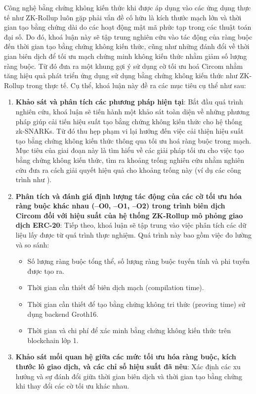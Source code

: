 Công nghệ bằng chứng không kiến thức khi được áp dụng vào các ứng dụng thực tế như ZK-Rollup luôn gặp phải vấn đề cố hữu là kích thước mạch lớn và thời gian tạo bằng chứng dài do các hoạt động mật mã phức tạp trong các thuật toán đại số. Do đó, khoá luận này sẽ tập trung nghiên cứu vào tác động của ràng buộc đến thời gian tạo bằng chứng không kiến thức, cũng như những đánh đổi về thời gian biên dịch để tối ưu mạch chứng minh không kiến thức nhằm giảm số lượng ràng buộc. Từ đó đưa ra một khung gợi ý sử dụng cờ tối ưu hoá Circom nhằm tăng hiệu quả phát triển ứng dụng sử dụng bằng chứng không kiến thức như ZK-Rollup trong thực tế. 
Cụ thể, khoá luận này đề ra các mục tiêu cụ thể như sau:
\begin{enumerate}
    \item \textbf{Khảo sát và phân tích các phương pháp hiện tại}: Bắt đầu quá trình nghiên cứu, khoá luận sẽ tiến hành một khảo sát toàn diện về những phương pháp giúp cải tiến hiệu suất tạo bằng chứng không kiến thức cho hệ thống zk-SNARKs. Từ đó thu hẹp phạm vi lại hướng đến việc cải thiện hiệu suất tạo bằng chứng không kiến thức thông qua tối ưu hoá ràng buộc trong mạch. Mục tiêu của giai đoạn này là tìm hiểu về các giải pháp tối ưu cho việc tạo bằng chứng không kiến thức, tìm ra khoảng trống nghiên cứu nhằm nghiên cứu đưa ra cách giải quyết hiệu quả cho khoảng trống này (ví dụ các công trình như
    \cite{albert2022distilling, ben2018scalable, bunz2018bulletproofs, ernstberger2024zk,gabizon2019plonk,gong2022analysis, el2024evaluating,  pailoor2023automated}).
    \item \textbf{Phân tích và đánh giá định lượng tác động của các cờ tối ưu hóa ràng buộc khác nhau (--O0, --O1, --O2) trong trình biên dịch Circom đối với hiệu suất của hệ thống ZK-Rollup mô phỏng giao dịch ERC-20}: Tiếp theo, khoá luận sẽ tập trung vào việc phân tích các dữ liệu lấy được từ quá trình thực nghiệm. Quá trình này bao gồm việc đo lường và so sánh:
    \begin{itemize}
        \item Số lượng ràng buộc tổng thể, số lượng ràng buộc tuyến tính và phi tuyến được tạo ra.
        \item Thời gian cần thiết để biên dịch mạch (compilation time).
        \item Thời gian cần thiết để tạo bằng chứng không tri thức (proving time) sử dụng backend Groth16.
        \item Thời gian và chi phí để xác minh bằng chứng không kiến thức trên blockchain lớp 1.
    \end{itemize}
    \item \textbf{Khảo sát mối quan hệ giữa các mức tối ưu hóa ràng buộc, kích thước lô giao dịch, và các chỉ số hiệu suất đã nêu}: Xác định các xu hướng và sự đánh đổi giữa thời gian biên dịch và thời gian tạo bằng chứng khi thay đổi các cờ tối ưu khác nhau.


\end{enumerate}
